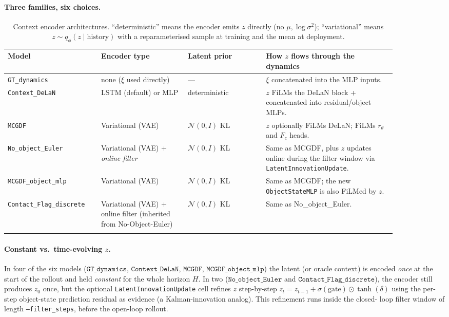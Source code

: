 \documentclass[11pt]{article}
\begin{document}
\paragraph{Three families, six choices.}
\begin{longtable}{p{0.20\linewidth} p{0.20\linewidth} p{0.18\linewidth} p{0.30\linewidth}}
\toprule
Model & Encoder type & Latent prior & How $z$ flows through the dynamics \\
\midrule
\texttt{GT\_dynamics}            & none ($\xi$ used directly)     & ---                & $\xi$ concatenated into the MLP inputs. \\
\texttt{Context\_DeLaN}          & LSTM (default) or MLP          & deterministic      & $z$ FiLMs the DeLaN block + concatenated into residual/object MLPs. \\
\texttt{MCGDF}                   & Variational (VAE)              & $\mathcal{N}(0, I)$ KL                & $z$ optionally FiLMs DeLaN; FiLMs $r_\theta$ and $F_c$ heads. \\
\texttt{No\_object\_Euler}       & Variational (VAE) + \emph{online filter} & $\mathcal{N}(0, I)$ KL                & Same as MCGDF, plus $z$ updates online during the filter window via \texttt{LatentInnovationUpdate}. \\
\texttt{MCGDF\_object\_mlp}      & Variational (VAE)              & $\mathcal{N}(0, I)$ KL                & Same as MCGDF; the new \texttt{ObjectStateMLP} is also FiLMed by $z$. \\
\texttt{Contact\_Flag\_discrete} & Variational (VAE) + online filter (inherited from No-Object-Euler) & $\mathcal{N}(0, I)$ KL                & Same as No\_object\_Euler. \\
\bottomrule
\caption{Context encoder architectures.  ``deterministic'' means the
encoder emits $z$ directly (no $\mu, \log\sigma^2$); ``variational''
means $z \sim q_\phi(z \mid \mathrm{history})$ with a reparameterised
sample at training and the mean at deployment.}
\label{tab:cmp-encoder}
\end{longtable}

\paragraph{Constant vs.\ time-evolving $z$.}
In four of the six models ($\texttt{GT\_dynamics}$, $\texttt{Context\_DeLaN}$,
$\texttt{MCGDF}$, $\texttt{MCGDF\_object\_mlp}$) the latent (or oracle
context) is encoded \emph{once} at the start of the rollout and held
\emph{constant} for the whole horizon $H$.  In two
($\texttt{No\_object\_Euler}$ and $\texttt{Contact\_Flag\_discrete}$),
the encoder still produces $z_0$ once, but the optional
\texttt{LatentInnovationUpdate} cell refines $z$ step-by-step
\(
  z_t = z_{t-1} + \sigma(\text{gate}) \odot \tanh(\delta)
\)
using the per-step object-state prediction residual as evidence (a
Kalman-innovation analog).  This refinement runs inside the closed-
loop filter window of length \texttt{--filter\_steps}, before the
open-loop rollout.
\end{document}
